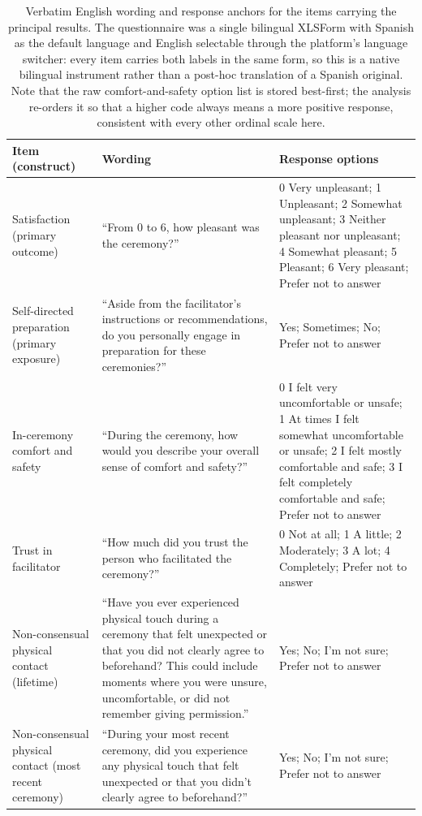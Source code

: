 \documentclass[12pt]{article}
\begin{document}
\begin{table}[htbp]
\centering
\small
{}
\caption{Verbatim English wording and response anchors for the items carrying the principal results. The
questionnaire was a single bilingual XLSForm with Spanish as the default language and English selectable
through the platform's language switcher: every item carries both labels in the same form, so this is a
native bilingual instrument rather than a post-hoc translation of a Spanish original. Note that the raw
comfort-and-safety option list is stored best-first; the analysis re-orders it so that a higher code always
means a more positive response, consistent with every other ordinal scale here.}
\label{tab:items}
\vspace{0.8em}  %
\begin{tabular}{p{3cm}p{5.6cm}p{5.4cm}}
\toprule
Item (construct) & Wording & Response options \\
\midrule
Satisfaction \newline (primary outcome) &
``From 0 to 6, how pleasant was the ceremony?'' &
0 Very unpleasant; 1 Unpleasant; 2 Somewhat unpleasant; 3 Neither pleasant nor unpleasant; 4 Somewhat
pleasant; 5 Pleasant; 6 Very pleasant; Prefer not to answer \\
\addlinespace
Self-directed preparation \newline (primary exposure) &
``Aside from the facilitator's instructions or recommendations, do you personally engage in preparation for
these ceremonies?'' &
Yes; Sometimes; No; Prefer not to answer \\
\addlinespace
In-ceremony comfort and safety &
``During the ceremony, how would you describe your overall sense of comfort and safety?'' &
0 I felt very uncomfortable or unsafe; 1 At times I felt somewhat uncomfortable or unsafe; 2 I felt mostly
comfortable and safe; 3 I felt completely comfortable and safe; Prefer not to answer \\
\addlinespace
Trust in facilitator &
``How much did you trust the person who facilitated the ceremony?'' &
0 Not at all; 1 A little; 2 Moderately; 3 A lot; 4 Completely; Prefer not to answer \\
\addlinespace
Non-consensual physical contact \newline (lifetime) &
``Have you ever experienced physical touch during a ceremony that felt unexpected or that you did not
clearly agree to beforehand? This could include moments where you were unsure, uncomfortable, or did not
remember giving permission.'' &
Yes; No; I'm not sure; Prefer not to answer \\
\addlinespace
Non-consensual physical contact \newline (most recent ceremony) &
``During your most recent ceremony, did you experience any physical touch that felt unexpected or that you
didn't clearly agree to beforehand?'' &
Yes; No; I'm not sure; Prefer not to answer \\
\bottomrule
\end{tabular}
\end{table}
\end{document}

